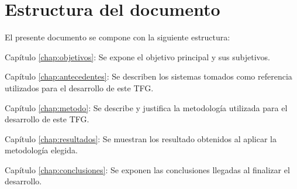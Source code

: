  
\section{Estructura del documento}

El presente documento se compone con la siguiente estructura:

\begin{definitionlist}
\item[Capítulo \ref{chap:objetivos}: \nameref{chap:objetivos}] Se expone el objetivo principal y sus subjetivos.
 \item[Capítulo \ref{chap:antecedentes}: \nameref{chap:antecedentes}] Se describen los sistemas tomados como referencia utilizados para 
 el desarrollo de este \acs{TFG}.
  \item [Capítulo \ref{chap:metodo}: \nameref{chap:metodo}] Se describe y justifica la metodología utilizada para el desarrollo de este \acs{TFG}.
  \item[Capítulo \ref{chap:resultados}: \nameref{chap:resultados}] Se muestran los resultado obtenidos al aplicar la metodología elegida.
  \item[Capítulo \ref{chap:conclusiones}: \nameref{chap:conclusiones}] Se exponen las conclusiones llegadas al finalizar el desarrollo.
\end{definitionlist}

